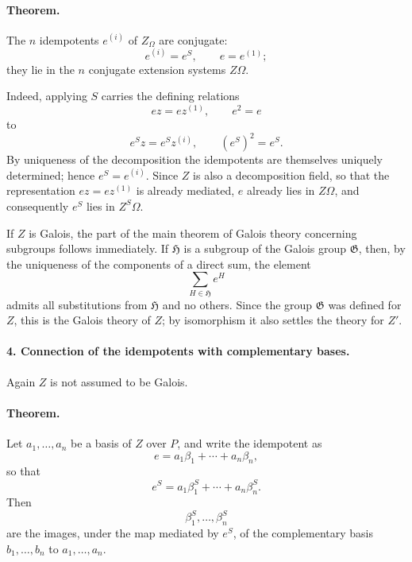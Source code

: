 \documentclass[11pt]{article}
\providecommand{\Gcal}{\mathfrak G}
\begin{document}
\paragraph{Theorem.}
The \(n\) idempotents \(e^{(i)}\) of \(Z_\Omega\) are conjugate:
\[
        e^{(i)}=e^S,\qquad e=e^{(1)};
\]
they lie in the \(n\) conjugate extension systems \(Z\Omega\).

Indeed, applying \(S\) carries the defining relations
\[
        ez=ez^{(1)},\qquad e^2=e
\]
to
\[
        e^S z=e^S z^{(i)},\qquad (e^S)^2=e^S .
\]
By uniqueness of the decomposition the idempotents are themselves uniquely determined; hence \(e^S=e^{(i)}\). Since \(Z\) is also a decomposition field, so that the representation \(ez=ez^{(1)}\) is already mediated, \(e\) already lies in \(Z\Omega\), and consequently \(e^S\) lies in \(Z^S\Omega\).

If \(Z\) is Galois, the part of the main theorem of Galois theory concerning subgroups follows immediately. If \(\mathfrak H\) is a subgroup of the Galois group \(\Gcal\), then, by the uniqueness of the components of a direct sum, the element
\[
        \sum_{H\in\mathfrak H} e^H
\]
admits all substitutions from \(\mathfrak H\) and no others. Since the group \(\Gcal\) was defined for \(Z\), this is the Galois theory of \(Z\); by isomorphism it also settles the theory for \(Z'\).

\paragraph{4. Connection of the idempotents with complementary bases.}
Again \(Z\) is not assumed to be Galois.

\paragraph{Theorem.}
Let \(a_1,\ldots,a_n\) be a basis of \(Z\) over \(P\), and write the idempotent as
\[
        e=a_1\beta_1+\cdots+a_n\beta_n,
\]
so that
\[
        e^S=a_1\beta_1^S+\cdots+a_n\beta_n^S .
\]
Then
\[
        \beta_1^S,\ldots,\beta_n^S
\]
are the images, under the map mediated by \(e^S\), of the complementary basis \(b_1,\ldots,b_n\) to \(a_1,\ldots,a_n\).
\end{document}
